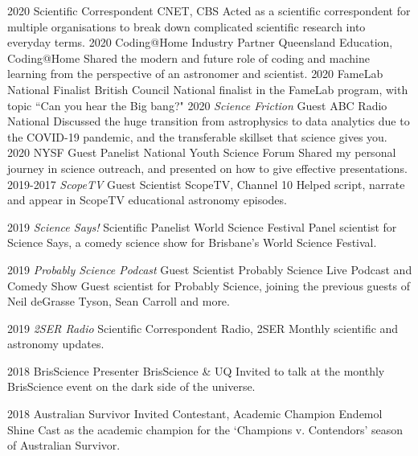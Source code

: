 \begin{entrylist}
\entry
    {2020}
    {Scientific Correspondent}
    {CNET, CBS}
    {Acted as a scientific correspondent for multiple organisations to break down complicated scientific research into everyday terms.}
\entry
	{2020}
	{Coding@Home Industry Partner}
	{Queensland Education, Coding@Home}
	{Shared the modern and future role of coding and machine learning from the perspective of an astronomer and scientist.}
\entry
    {2020}
    {FameLab National Finalist}
    {British Council}
    {National finalist in the FameLab program, with topic ``Can you hear the Big bang?"}
\entry
    {2020}
    {\textit{Science Friction} Guest}
    {ABC Radio National}
    {Discussed the huge transition from astrophysics to data analytics due to the COVID-19 pandemic, and the transferable skillset that science gives you.}
\entry
	{2020}
	{NYSF Guest Panelist}
	{National Youth Science Forum}
	{Shared my personal journey in science outreach, and presented on how to give effective presentations.}
\entry
	{2019-2017}
	{\textit{ScopeTV} Guest Scientist}
	{ScopeTV, Channel 10}
	{Helped script, narrate and appear in ScopeTV educational astronomy episodes.}
\end{entrylist}
\begin{entrylist}
\entry
	{2019}
	{\textit{Science Says!} Scientific Panelist}
	{World Science Festival}
	{Panel scientist for Science Says, a comedy science show for Brisbane's World Science Festival.}
\end{entrylist}
\begin{entrylist}
\entry
	{2019}
	{\textit{Probably Science Podcast }Guest Scientist}
	{Probably Science Live Podcast and Comedy Show}
	{Guest scientist for Probably Science, joining the previous guests of Neil deGrasse Tyson, Sean Carroll and more.}
\end{entrylist}
\begin{entrylist}
\entry
	{2019}
	{\textit{2SER Radio} Scientific Correspondent}
	{Radio, 2SER}
	{Monthly scientific and astronomy updates.}
\end{entrylist}
\begin{entrylist}
\entry
    {2018}
    {BrisScience Presenter}
    {BrisScience \& UQ}
    {Invited to talk at the monthly BrisScience event on the dark side of the universe.}
\end{entrylist}
\begin{entrylist}
\entry
    {2018}
    {Australian Survivor Invited Contestant, Academic Champion}
    {Endemol Shine}
    {Cast as the academic champion for the `Champions v. Contendors' season of Australian Survivor.}
\end{entrylist}

